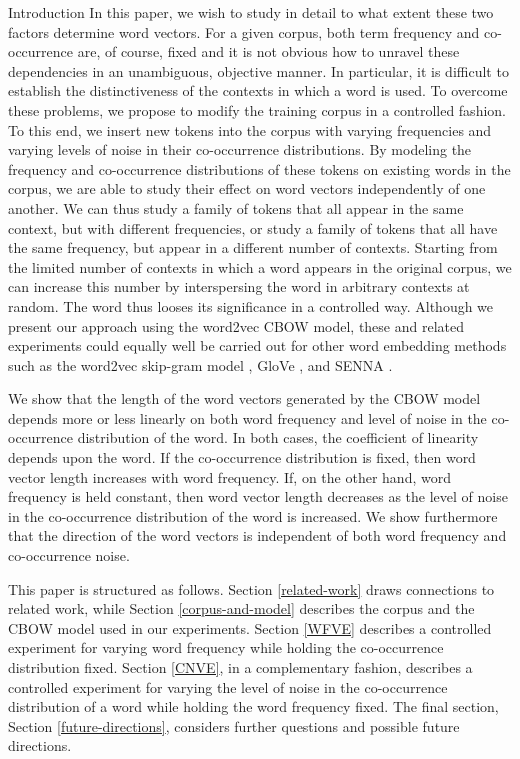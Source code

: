 \documentclass{article} %
\begin{document}
\begin{section}{Introduction}
In this paper, we wish to study in detail to what extent these two
factors determine word vectors.  For a given corpus, both term
frequency and co-occurrence are, of course, fixed and it is not obvious
how to unravel these dependencies in an unambiguous, objective manner.
In particular, it is difficult to establish the distinctiveness of the
contexts in which a word is used.  To overcome these problems, we
propose to modify the training corpus in a controlled fashion.  To
this end, we insert new tokens into the corpus with varying frequencies
and varying levels of noise in their co-occurrence distributions.  By
modeling the frequency and co-occurrence distributions of these tokens
on existing words in the corpus, we are able to study their effect on
word vectors independently of one another.  We can thus study a family
of tokens that all appear in the same context, but with different
frequencies, or study a family of tokens that all have the same
frequency, but appear in a different number of contexts.  Starting from
the limited number of contexts in which a word appears in the original
corpus, we can increase this number by interspersing the word in arbitrary
contexts at random.  The word thus looses its significance in a
controlled way.  Although we present our approach using the word2vec
CBOW model, these and related experiments could equally well be carried
out for other word embedding methods such as the word2vec skip-gram
model \cite{DistRepns,EfficientEstimation}, GloVe
\cite{pennington2014glove}, and SENNA \cite{collobert-2011}.

We show that the length of the word vectors generated by the CBOW model
depends more or less linearly on both word frequency and level of noise
in the co-occurrence distribution of the word.  In both cases, the
coefficient of linearity depends upon the word.  If the co-occurrence
distribution is fixed, then word vector length increases with word
frequency.  If, on the other hand, word frequency is held constant, then
word vector length decreases as the level of noise in the co-occurrence
distribution of the word is increased.  We show furthermore that the
direction of the word vectors is independent of both word frequency and
co-occurrence noise.

This paper is structured as follows.  Section \ref{related-work} draws
connections to related work, while Section \ref{corpus-and-model} describes
the corpus and the CBOW model used in our experiments.
Section \ref{WFVE} describes a controlled experiment for varying word
frequency while holding the co-occurrence distribution fixed.
Section \ref{CNVE}, in a complementary fashion, describes a controlled
experiment for varying the level of noise in the co-occurrence
distribution of a word while holding the word frequency fixed.  The
final section, Section \ref{future-directions}, considers further questions
and possible future directions.
\end{section}
\end{document}
